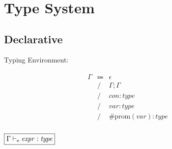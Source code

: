 \chapter{Type System}

\section{Declarative}

Typing Environment:

\begin{align*}
    \begin{array}{rcll}
        \Gamma
        &\Coloneq &\epsilon \\
        &\mathrel{/} &\Gamma; \Gamma \\
        &\mathrel{/} &\mathit{con}: \mathit{type} \\
        &\mathrel{/} &\mathit{var}: \mathit{type} \\
        &\mathrel{/} &\mathrm{\#prom}(\mathit{var}): \mathit{type} \\
    \end{array}
\end{align*}

$\fbox{$\Gamma \vdash_\mathrm{e} \mathit{expr}: \mathit{type}$}$

